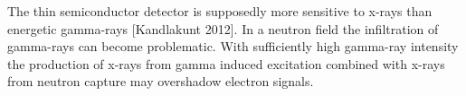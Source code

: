 The thin semiconductor detector is supposedly more sensitive to x-rays than energetic gamma-rays [Kandlakunt 2012]. In a neutron field the infiltration of gamma-rays can become problematic. With sufficiently high gamma-ray intensity the production of x-rays from gamma induced excitation combined with x-rays from neutron capture may overshadow electron signals.
